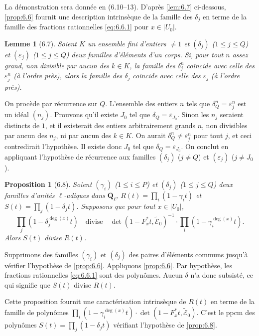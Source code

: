 \documentclass[12pt,a4paper]{amsart}
\theoremstyle{plain}
\newtheorem{lemme}[theoreme]{Lemme}
\newtheorem{proposition}[theoreme]{Proposition}
\theoremstyle{definition}
\theoremstyle{remark}
\newcommand{\Q}{\mathbf{Q}}
\numberwithin{equation}{section}
\begin{document}
La d\'emonstration sera donn\'ee en (6.10--13). D'apr\`es \eqref{lem:6.7} ci-dessous, \eqref{prop:6.6} fournit une description intrins\`eque de la famille des $\delta_j$ en terme de la famille des fractions rationnelles \eqref{eq:6.6.1} pour $x\in|U_0|$.

\begin{lemme}[6.7]\label{lem:6.7}
Soient $K$ un ensemble fini d'entiers $\not=1$ et $(\delta_j)$ ($1\le j\le Q$) et $(\varepsilon_j)$ ($1\le j\le Q$) deux familles d'\'el\'ements d'un corps. Si, pour tout $n$ assez grand, non divisible par aucun des $k\in K$, la famille des $\delta_j^n$ co\"incide avec celle des $\varepsilon_j^n$ (\`a l'ordre pr\`es), alors la famille des $\delta_j$ co\"incide avec celle des $\varepsilon_j$ (\`a l'ordre pr\`es).
\end{lemme}

On proc\`ede par r\'ecurrence sur $Q$. L'ensemble des entiers $n$ tels que $\delta_Q^n=\varepsilon_j^n$ est un id\'eal $(n_j)$. Prouvons qu'il existe $J_0$ tel que $\delta_Q=\varepsilon_{J_0}$. Sinon les $n_j$ seraient distincts de $1$, et il existerait des entiers arbitrairement grands $n$, non divisibles par aucun des $n_j$, ni par aucun des $k\in K$. On aurait $\delta_Q^n\not=\varepsilon_j^n$ pour tout $j$, et ceci contredirait l'hypoth\`ese. Il existe donc $J_0$ tel que $\delta_Q=\varepsilon_{J_0}$. On conclut en appliquant l'hypoth\`ese de r\'ecurrence aux familles $(\delta_j)$ ($j\not=Q$) et $(\varepsilon_j)$ ($j\not=J_0$).

\begin{proposition}[6.8]\label{prop:6.8}
Soient $(\gamma_i)$ ($1\le i\le P$) et $(\delta_j)$ ($1\le j\le Q$) deux familles d'unit\'es $\ell$-adiques dans $\overline{\Q}_\ell$, $R(t)=\prod_i(1-\gamma_i t)$ et $S(t)=\prod_j(1-\delta_j t)$. Supposons que pour tout $x\in|U_0|$,
\[
\prod_j(1-\delta_j^{\deg(x)} t) \quad \text{divise} \quad \det(1-F_x^\ast t, \widetilde{\mathscr{E}}_0)^{-1} \cdot \prod_i(1-\gamma_i^{\deg(x)} t).
\]
Alors $S(t)$ divise $R(t)$.
\end{proposition}

Supprimons des familles $(\gamma_i)$ et $(\delta_j)$ des paires d'\'el\'ements communs jusqu'\`a v\'erifier l'hypoth\`ese de \eqref{prop:6.6}. Appliquons \eqref{prop:6.6}. Par hypoth\`ese, les fractions rationnelles \eqref{eq:6.6.1} sont des polyn\^omes. Aucun $\delta$ n'a donc subsist\'e, ce qui signifie que $S(t)$ divise $R(t)$.

Cette proposition fournit une caract\'erisation intrins\`eque de $R(t)$ en terme de la famille de polyn\^omes $\prod_i(1-\gamma_i^{\deg(x)} t)\cdot\det(1-F_x^\ast t, \widetilde{\mathscr{E}}_0)$. C'est le ppcm des polyn\^omes $S(t)=\prod_j(1-\delta_j t)$ v\'erifiant l'hypoth\`ese de \eqref{prop:6.8}.
\end{document}
